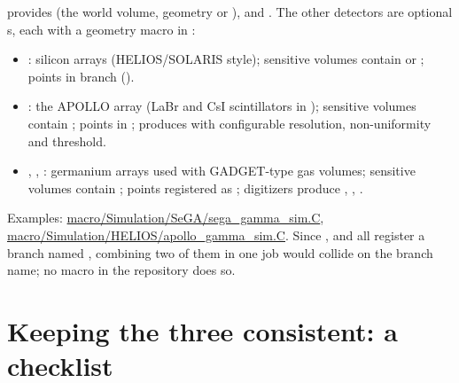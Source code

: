  provides  (the world volume, geometry  or
),  and . The other detectors are optional
s, each with a geometry macro in :
\begin{itemize}
  \item {}: silicon arrays (HELIOS/SOLARIS style); sensitive volumes contain
     or ; points in branch  ().
  \item {}: the APOLLO array (LaBr and CsI scintillators in );
    sensitive volumes contain ; points in ; 
    produces  with configurable resolution, non-uniformity and threshold.
  \item {}, , : germanium arrays used with GADGET-type gas
    volumes; sensitive volumes contain ; points registered as ;
    digitizers produce , , .
\end{itemize}
Examples: \url{macro/Simulation/SeGA/sega_gamma_sim.C}, \url{macro/Simulation/HELIOS/apollo_gamma_sim.C}.
Since ,  and  all register a branch named ,
combining two of them in one job would collide on the branch name; no macro in the repository does so.

\section{Keeping the three consistent: a checklist}
\label{sec:par-checklist}

